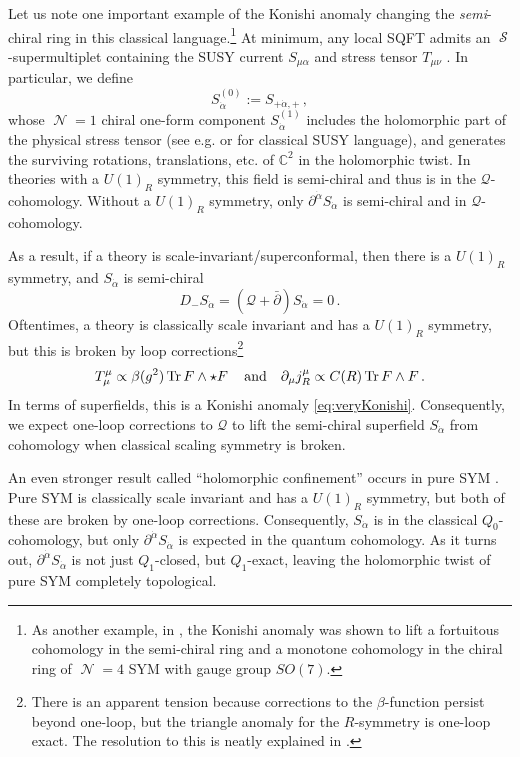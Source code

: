 \documentclass[11pt]{article}
\DeclareMathOperator{\calN}{\mathcal{N}}
\DeclareMathOperator{\calS}{\mathcal{S}}
\def\bbC{\mathbb{C}}
\renewcommand{\bm}{\mathcal}
\begin{document}
Let us note one important example of the Konishi anomaly changing the \textit{semi}-chiral ring in this classical language.\footnote{As another example, in \cite{Choi:2025bhi}, the Konishi anomaly was shown to lift a fortuitous cohomology in the semi-chiral ring and a monotone cohomology in the chiral ring of $\calN=4$ SYM with gauge group $SO(7)$.} At minimum, any local SQFT admits an $\calS$-supermultiplet containing the SUSY current $S_{\mu\alpha}$ and stress tensor $T_{\mu\nu}$ \cite{Dumitrescu:2011iu}. In particular, we define
\begin{equation}
    S^{(0)}_{\dot\alpha} := S_{+\dot\alpha,+}\,,
\end{equation}
whose $\calN=1$ chiral one-form component $S^{(1)}_{\dot\alpha}$ includes the holomorphic part of the physical stress tensor (see e.g. \cite{Budzik:2023xbr, Bomans:2023mkd, Bomans:2025klo} or \cite{Closset:2013vra, Closset:2014uda, Dumitrescu:2016ltq} for classical SUSY language), and generates the surviving rotations, translations, etc. of $\bbC^2$ in the holomorphic twist. In theories with a $U(1)_R$ symmetry, this field is semi-chiral and thus is in the $\bm{Q}$-cohomology. Without a $U(1)_R$ symmetry, only $\partial^{\dot\alpha} S_{\dot\alpha}$ is semi-chiral and in $\bm{Q}$-cohomology. 

As a result, if a theory is scale-invariant/superconformal, then there is a $U(1)_R$ symmetry, and $S_{\dot\alpha}$ is semi-chiral
\begin{equation}\label{eq:semiChiralST}
    D_- S_{\dot\alpha} = (\bm{Q} + \bar\partial)S_{\dot\alpha} = 0\,.
\end{equation}
Oftentimes, a theory is classically scale invariant and has a $U(1)_R$ symmetry, but this is broken by loop corrections\footnote{There is an apparent tension because corrections to the $\beta$-function persist beyond one-loop, but the triangle anomaly for the $R$-symmetry is one-loop exact. The resolution to this is neatly explained in \cite{Yonekura:2010mc}.}
\begin{equation}
    T_{\mu}^{\mu} 
        \propto \beta(g^2) \Tr F\wedge \star F\,
        \quad\text{and}\quad
    \partial_\mu j_R^\mu
        \propto C(R) \Tr F\wedge F\,.
\end{equation}
In terms of superfields, this is a Konishi anomaly \eqref{eq:veryKonishi}. Consequently, we expect one-loop corrections to $\bm{Q}$ to lift the semi-chiral superfield $S_{\dot\alpha}$ from cohomology when classical scaling symmetry is broken.

An even stronger result called ``holomorphic confinement'' occurs in pure SYM \cite{Budzik:2023xbr}. Pure SYM is classically scale invariant and has a $U(1)_R$ symmetry, but both of these are broken by one-loop corrections. Consequently, $S_{\dot\alpha}$ is in the classical $Q_0$-cohomology, but only $\partial^{\dot\alpha} S_{\dot\alpha}$ is expected in the quantum cohomology. As it turns out, $\partial^{\dot\alpha} S_{\dot\alpha}$ is not just $Q_1$-closed, but $Q_1$-exact, leaving the holomorphic twist of pure SYM completely topological.
\end{document}
